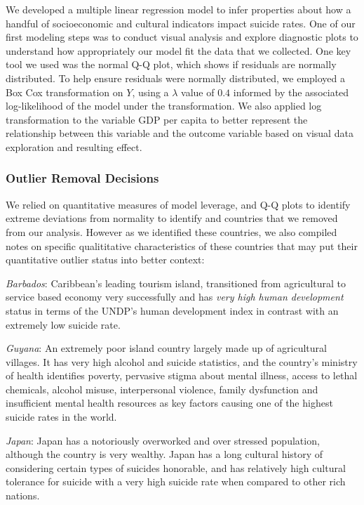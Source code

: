 \documentclass[]{article}
\begin{document}
We developed a multiple linear regression model to infer properties
about how a handful of socioeconomic and cultural indicators impact
suicide rates. One of our first modeling steps was to conduct visual
analysis and explore diagnostic plots to understand how appropriately
our model fit the data that we collected. One key tool we used was the
normal Q-Q plot, which shows if residuals are normally distributed. To
help ensure residuals were normally distributed, we employed a Box Cox
transformation on \(Y\), using a \(\lambda\) value of \(0.4\) informed
by the associated log-likelihood of the model under the transformation.
We also applied log transformation to the variable GDP per capita to
better represent the relationship between this variable and the outcome
variable based on visual data exploration and resulting effect.

\subsubsection{Outlier Removal
Decisions}\label{outlier-removal-decisions}

We relied on quantitative measures of model leverage, and Q-Q plots to
identify extreme deviations from normality to identify and countries
that we removed from our analysis. However as we identified these
countries, we also compiled notes on specific qualititative
characteristics of these countries that may put their quantitative
outlier status into better context:

\emph{Barbados}: Caribbean's leading tourism island, transitioned from
agricultural to service based economy very successfully and has
\emph{very high human development} status in terms of the UNDP's human
development index in contrast with an extremely low suicide rate.

\emph{Guyana}: An extremely poor island country largely made up of
agricultural villages. It has very high alcohol and suicide statistics,
and the country's ministry of health identifies poverty, pervasive
stigma about mental illness, access to lethal chemicals, alcohol misuse,
interpersonal violence, family dysfunction and insufficient mental
health resources as key factors causing one of the highest suicide rates
in the world.

\emph{Japan}: Japan has a notoriously overworked and over stressed
population, although the country is very wealthy. Japan has a long
cultural history of considering certain types of suicides honorable, and
has relatively high cultural tolerance for suicide with a very high
suicide rate when compared to other rich nations.
\end{document}
